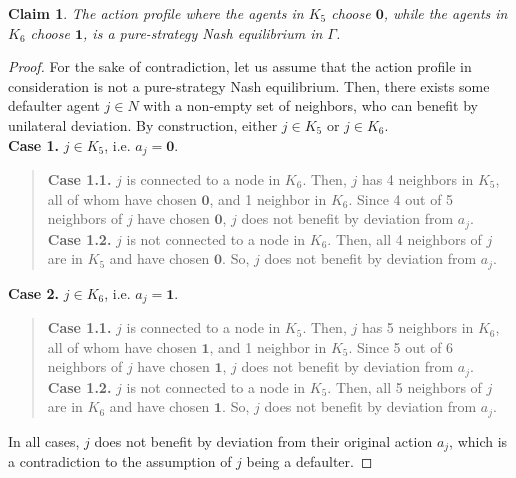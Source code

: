 \documentclass[9pt]{article}
\newtheorem{claim}{Claim}
\begin{document}
\begin{claim}
    The action profile where the agents in $K_{5}$ choose $\textbf{0}$, while the agents in $K_{6}$ choose $\textbf{1}$, is a pure-strategy Nash equilibrium in $\Gamma$.
\end{claim}
\begin{proof}
    For the sake of contradiction, let us assume that the action profile in consideration is not a pure-strategy Nash equilibrium.
    Then, there exists some defaulter agent $j \in N$ with a non-empty set of neighbors, who can benefit by unilateral deviation.
    By construction, either $j \in K_{5}$ or $j \in K_{6}$.
    \vspace*{5pt} \\
    \textbf{Case 1.} $j \in K_{5}$, i.e. $a_{j} = \textbf{0}$.
    \begin{quote}
        \textbf{Case 1.1.} $j$ is connected to a node in $K_{6}$.
        Then, $j$ has 4 neighbors in $K_{5}$, all of whom have chosen $\textbf{0}$, and 1 neighbor in $K_{6}$.
        Since 4 out of 5 neighbors of $j$ have chosen $\textbf{0}$, $j$ does not benefit by deviation from $a_{j}$.
        \vspace*{3pt} \\
        \textbf{Case 1.2.} $j$ is not connected to a node in $K_{6}$.
        Then, all 4 neighbors of $j$ are in $K_{5}$ and have chosen $\textbf{0}$.
        So, $j$ does not benefit by deviation from $a_{j}$.
    \end{quote}
    \textbf{Case 2.} $j \in K_{6}$, i.e. $a_{j} = \textbf{1}$.
    \begin{quote}
        \textbf{Case 1.1.} $j$ is connected to a node in $K_{5}$.
        Then, $j$ has 5 neighbors in $K_{6}$, all of whom have chosen $\textbf{1}$, and 1 neighbor in $K_{5}$.
        Since 5 out of 6 neighbors of $j$ have chosen $\textbf{1}$, $j$ does not benefit by deviation from $a_{j}$.
        \vspace*{3pt} \\
        \textbf{Case 1.2.} $j$ is not connected to a node in $K_{5}$.
        Then, all 5 neighbors of $j$ are in $K_{6}$ and have chosen $\textbf{1}$.
        So, $j$ does not benefit by deviation from $a_{j}$.
    \end{quote}
    In all cases, $j$ does not benefit by deviation from their original action $a_{j}$, which is a contradiction to the assumption of $j$ being a defaulter.
\end{proof}
\end{document}
